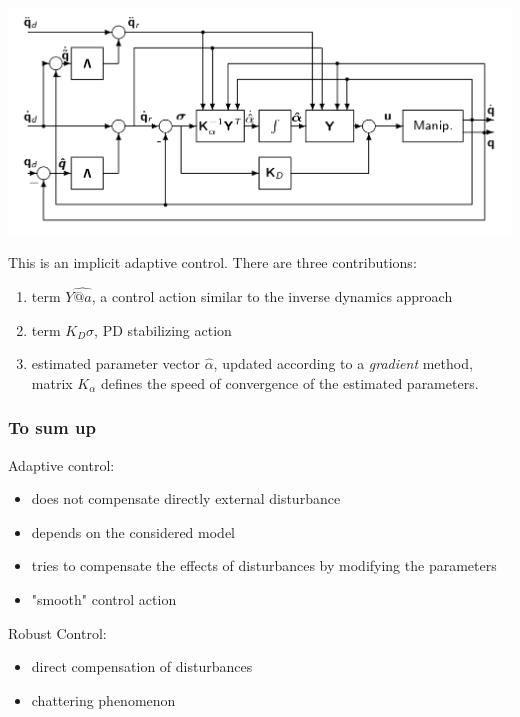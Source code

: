 \documentclass{book}
\begin{document}
\includegraphics[width=\textwidth]{adapctrl}

This is an implicit adaptive control. There are three contributions: 
\begin{enumerate}
    \item term $Y\hat{@a}$, a control action similar to the inverse dynamics approach 
        \item term $K_D\sigma$, PD stabilizing action 
        \item estimated parameter vector $\hat{\alpha}$, updated according to a \emph{gradient} method, matrix $K_\alpha$ defines the speed of convergence of the estimated parameters.
\end{enumerate}
\subsubsection{To sum up}

Adaptive control:
\begin{itemize}
    \item does not compensate directly external disturbance
    \item depends on the considered model 
    \item tries to compensate the effects of disturbances by modifying the parameters 
    \item "smooth" control action
\end{itemize}

Robust Control:
\begin{itemize}
    \item direct compensation of disturbances 
    \item chattering phenomenon
\end{itemize}
\end{document}
